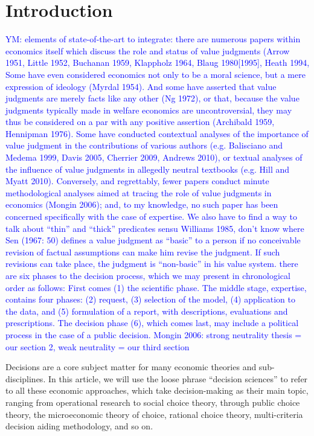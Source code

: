 \documentclass[preprint, french, english, 11pt, authoryear]{elsarticle}%
\newcommand{\commentYM}[1]{\textcolor{blue}{YM: #1}}
\begin{document}
\section{Introduction}

\commentYM{elements of state-of-the-art to integrate: there are numerous papers within economics itself
which discuss the role and status of value judgments (Arrow 1951, Little 1952,
Buchanan 1959, Klappholz 1964, Blaug 1980[1995], Heath 1994, Some have
even considered economics not only to be a moral science, but a mere expression
of ideology (Myrdal 1954). And some have asserted that value judgments
are merely facts like any other (Ng 1972), or that, because the value judgments
typically made in welfare economics are uncontroversial, they may thus be considered
on a par with any positive assertion (Archibald 1959, Hennipman 1976).
Some have conducted contextual analyses of the importance of value judgment
in the contributions of various authors (e.g. Balisciano and Medema 1999, Davis
2005, Cherrier 2009, Andrews 2010), or textual analyses of the influence of value
judgments in allegedly neutral textbooks (e.g. Hill and Myatt 2010). Conversely,
and regrettably, fewer papers conduct minute methodological analyses aimed at
tracing the role of value judgments in economics (Mongin 2006); and, to my
knowledge, no such paper has been concerned specifically with the case of expertise.
We also have to find a way to talk about ``thin'' and ``thick'' predicates sensu Williams 1985, don't know where
Sen (1967: 50) defines a value judgment
as “basic” to a person if no conceivable revision of factual assumptions can
make him revise the judgment. If such revisions can take place, the judgment is
“non-basic” in his value system.
there are six phases to the decision
process, which we may present in chronological order as follows: First comes
(1) the scientific phase. The middle stage, expertise, contains four phases: (2) request,
(3) selection of the model, (4) application to the data, and (5) formulation of
a report, with descriptions, evaluations and prescriptions. The decision phase (6),
which comes last, may include a political process in the case of a public decision.
Mongin 2006: strong neutrality thesis = our section 2, weak neutrality = our third section}

Decisions are a core subject matter for many economic theories and sub-disciplines. In this article, we will use the loose phrase ``decision sciences'' to refer to all these economic approaches, which take decision-making as their main topic, ranging from operational research to social choice theory, through public choice theory, the microeconomic theory of choice, rational choice theory, multi-criteria decision aiding methodology, and so on.
\end{document}
